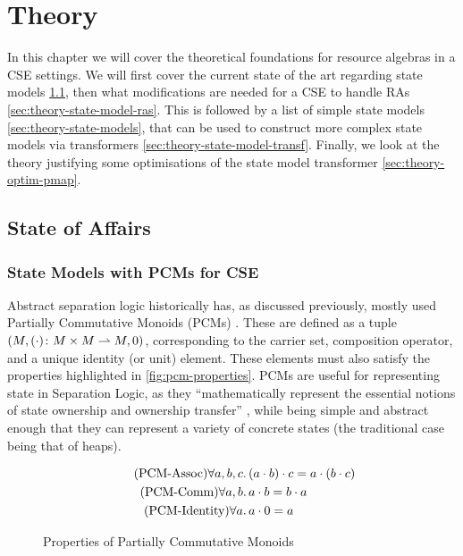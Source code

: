 \chapter{Theory} \label{chap:theory}

In this chapter we will cover the theoretical foundations for resource algebras in a CSE settings. We will first cover the current state of the art regarding state models \cref{sec:theory-state-of-affairs}, then what modifications are needed for a CSE to handle RAs \cref{sec:theory-state-model-ras}. This is followed by a list of simple state models \cref{sec:theory-state-models}, that can be used to construct more complex state models via transformers \cref{sec:theory-state-model-transf}. Finally, we look at the theory justifying some optimisations of the \PMap{} state model transformer \cref{sec:theory-optim-pmap}.

\section{State of Affairs} \label{sec:theory-state-of-affairs}

\subsection{State Models with PCMs for CSE}

Abstract separation logic historically has, as discussed previously, mostly used Partially Commutative Monoids (PCMs) \cite{abstractseplogic,sepalgebra,iris1,higherorderseplogic}. These are defined as a tuple ${(M, (\cdot)\colon M\times M\rightharpoonup M, 0)}$, corresponding to the carrier set, composition operator, and a unique identity (or unit) element. These elements must also satisfy the properties highlighted in \autoref{fig:pcm-properties}. PCMs are useful for representing state in Separation Logic, as they ``mathematically represent the essential notions of state ownership and ownership transfer'' \cite{abstractpcm}, while being simple and abstract enough that they can represent a variety of concrete states (the traditional case being that of heaps).

\begin{figure}
	\centering
	\begin{align*}
	\tag{PCM-Assoc} \forall a,b,c&\ldotp (a\cdot b)\cdot c = a\cdot (b\cdot c)\\
	\tag{PCM-Comm} \forall a,b&\ldotp a\cdot b = b\cdot a\\
	\tag{PCM-Identity} \forall a&\ldotp a\cdot 0 = a
	\end{align*} 
	\caption{Properties of Partially Commutative Monoids}
	\label{fig:pcm-properties}
\end{figure}


